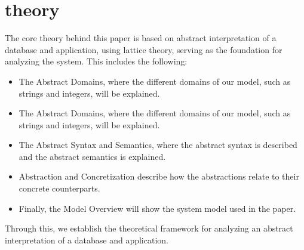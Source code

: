 \section{theory}\label{theory}
The core theory behind this paper is based on abstract interpretation of a database and application, using lattice theory, serving as the foundation for analyzing the system.
This includes the following:

\begin{itemize}
    \item The Abstract Domains, where the different domains of our model, such as strings and integers, will be explained.
    \item The Abstract Domains, where the different domains of our model, such as strings and integers, will be explained.
    \item The Abstract Syntax and Semantics, where the abstract syntax is described and the abstract semantics is explained.
    \item Abstraction and Concretization describe how the abstractions relate to their concrete counterparts.
    \item Finally, the Model Overview will show the system model used in the paper.
\end{itemize}
    Through this, we establish the theoretical framework for analyzing an abstract interpretation of a database and application.






